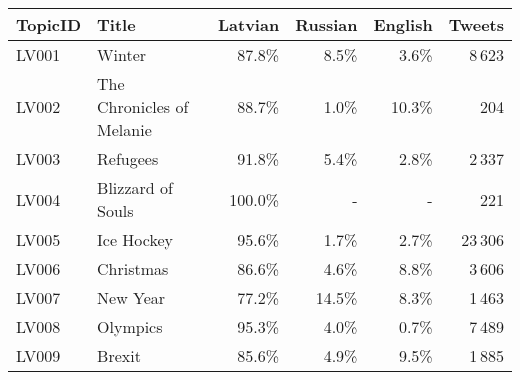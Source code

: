\begin{tabular}{llrrrr}
\toprule
TopicID  & Title &  Latvian & Russian & English &  Tweets \\
\midrule
LV001    & Winter & 87.8\% &  8.5\% &  3.6\% &   8\,623 \\
LV002    & The Chronicles of Melanie & 88.7\% &  1.0\% & 10.3\% &      204 \\
LV003    & Refugees & 91.8\% &  5.4\% &  2.8\% &   2\,337 \\
LV004    & Blizzard of Souls & 100.0\% &      - &      - &      221 \\
LV005    & Ice Hockey & 95.6\% &  1.7\% &  2.7\% &  23\,306 \\
LV006    & Christmas & 86.6\% &  4.6\% &  8.8\% &   3\,606 \\
LV007    & New Year & 77.2\% & 14.5\% &  8.3\% &   1\,463 \\
LV008    & Olympics & 95.3\% &  4.0\% &  0.7\% &   7\,489 \\
LV009    & Brexit & 85.6\% &  4.9\% &  9.5\% &   1\,885 \\
\bottomrule
\end{tabular}
